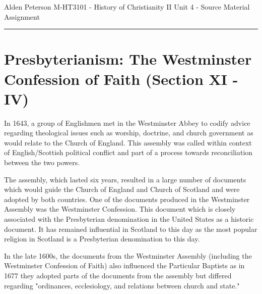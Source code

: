 \documentclass[12pt]{turabian-researchpaper}
\begin{document}
\begin{singlespace}
\noindent Alden Peterson \newline
\noindent M-HT3101 - History of Christianity II\newline
\noindent Unit 4 - Source Material Assignment
\newline\noindent\rule{4cm}{0.4pt}
\end{singlespace}




\section{Presbyterianism: The Westminster Confession of Faith (Section XI - IV)}

In 1643, a group of Englishmen met in the Westminster Abbey to codify advice regarding theological issues such as worship, doctrine, and church government as would relate to the Church of England.\autocite[pg.277]{woodbridge2013} This assembly was called within context of English/Scottish political conflict and part of a process towards reconciliation between the two powers.\autocite[pg.276]{woodbridge2013} 

The assembly, which lasted six years, resulted in a large number of documents which would guide the Church of England and Church of Scotland and were adopted by both countries.\autocite[pg.278]{woodbridge2013} One of the documents produced in the Westminster Assembly was the Westminster Confession. This document which is closely associated with the Presbyterian denomination in the United States as a historic document.\autocite[pg.306]{bettenson2011documents} It has remained influential in Scotland to this day as the most popular religion in Scotland is a Presbyterian denomination to this day.\autocite{wiki:scotlandReligion}

In the late 1600s, the documents from the Westminster Assembly (including the Westminster Confession of Faith) also influenced the Particular Baptists as in 1677 they adopted parts of the documents from the assembly but differed regarding "ordinances, ecclesiology, and relations between church and state."\autocite[pg.402]{woodbridge2013} 
\end{document}
